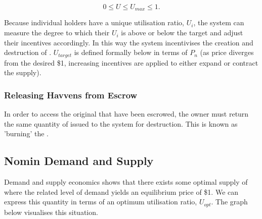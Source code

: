 $$ 0 \leq U \leq U_{max} \leq 1.$$

\noindent Because individual \HAV{} holders have a unique utilisation ratio, $ U_i $, the system can measure the degree to which their $ U_i $ is above or below the target and adjust their incentives accordingly. In this way the system incentivises the creation and destruction of \NOM{}. $ U_{target} $ is defined formally below in terms of $ P_n $ (as \NOM{} price diverges from the desired \$1, increasing incentives are applied to either expand or contract the supply).

\subsubsection{Releasing Havvens from Escrow}

\noindent In order to access the original \HAV{} that have been escrowed, the owner must return the same quantity of issued \NOM{} to the system for destruction. This is known as 'burning' the \NOM{}.

\newpage
\subsection{Nomin Demand and Supply} 

\noindent Demand and supply economics shows that there exists some optimal supply of \NOM{} where the related level of demand yields an equilibrium price of \$1. We can express this quantity in terms of an optimum utilisation ratio, $U_{opt}$. The graph below visualises this situation. \\

\begin{center}
\end{center}
	
